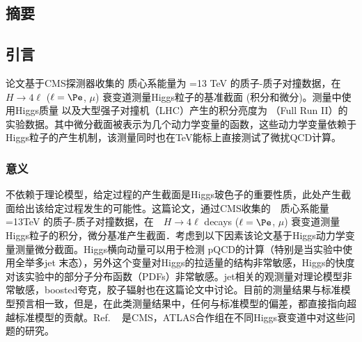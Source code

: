 \begin{CJK}{UTF8}{gbsn}
\chapter{摘要}
	\section{引言}\label{intro_chinese}
	论文基于CMS探测器收集的 质心系能量为 =13 TeV 的质子-质子对撞数据，在 $ H \to 4\ell$ ($\ell = \Pe$, $\mu$) 衰变道测量Higgs粒子的基准截面 (积分和微分)。测量中使用Higgs质量 以及大型强子对撞机（LHC）产生的积分亮度为 （Full Run II）的实验数据。其中微分截面被表示为几个动力学变量的函数，这些动力学变量依赖于Higgs粒子的产生机制，该测量同时也在TeV能标上直接测试了微扰QCD计算。
	\subsection{意义}\label{motivation_chinese}
不依赖于理论模型，给定过程的产生截面是Higgs玻色子的重要性质，此处产生截面给出该给定过程发生的可能性。这篇论文，通过CMS收集的　质心系能量 =13TeV 的质子-质子对撞数据，在　$ H \to 4\ell$ decays ($\ell = \Pe$, $\mu$) 衰变道测量Higgs粒子的积分，微分基准产生截面．考虑到以下因素该论文基于Higgs动力学变量测量微分截面。Higgs横向动量可以用于检测 pQCD的计算（特别是当实验中使用全举多jet 末态），另外这个变量对Higgs的拉适量的结构非常敏感，Higgs的快度对该实验中的部分子分布函数（PDFs）非常敏感。jet相关的观测量对理论模型非常敏感，boosted夸克，胶子辐射也在这篇论文中讨论。目前的测量结果与标准模型预言相一致，但是，在此类测量结果中，任何与标准模型的偏差，都直接指向超越标准模型的贡献。Ref. ~\cite{Khachatryan:2015yvw, CMS:2015hja, CMS:2016rqf, Sirunyan:2017exp, CMS:2018hhg, ATLAS-CONF-2019-029, CMSHggFiducial8TeV, atlas-conf-2019-025, ATLAS:2018uso, ATLAS-CONF-2019-032, ATLAS:2017myr,  CMS:Hgg_8TeV, CMS:2019chr, Sirunyan:2020xwk} 是CMS，ATLAS合作组在不同Higgs衰变道中对这些问题的研究。

\end{CJK}
